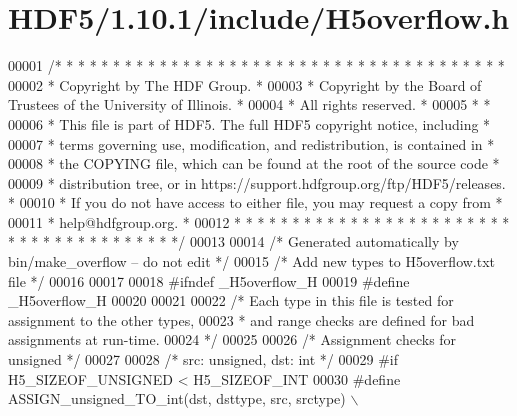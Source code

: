\hypertarget{_h_d_f5_21_810_81_2include_2_h5overflow_8h_source}{}\section{H\+D\+F5/1.10.1/include/\+H5overflow.h}
\label{_h_d_f5_21_810_81_2include_2_h5overflow_8h_source}

\begin{DoxyCode}
00001 \textcolor{comment}{/* * * * * * * * * * * * * * * * * * * * * * * * * * * * * * * * * * * * * * *}
00002 \textcolor{comment}{ * Copyright by The HDF Group.                                               *}
00003 \textcolor{comment}{ * Copyright by the Board of Trustees of the University of Illinois.         *}
00004 \textcolor{comment}{ * All rights reserved.                                                      *}
00005 \textcolor{comment}{ *                                                                           *}
00006 \textcolor{comment}{ * This file is part of HDF5.  The full HDF5 copyright notice, including     *}
00007 \textcolor{comment}{ * terms governing use, modification, and redistribution, is contained in    *}
00008 \textcolor{comment}{ * the COPYING file, which can be found at the root of the source code       *}
00009 \textcolor{comment}{ * distribution tree, or in https://support.hdfgroup.org/ftp/HDF5/releases.  *}
00010 \textcolor{comment}{ * If you do not have access to either file, you may request a copy from     *}
00011 \textcolor{comment}{ * help@hdfgroup.org.                                                        *}
00012 \textcolor{comment}{ * * * * * * * * * * * * * * * * * * * * * * * * * * * * * * * * * * * * * * */}
00013 
00014 \textcolor{comment}{/* Generated automatically by bin/make\_overflow -- do not edit */}
00015 \textcolor{comment}{/* Add new types to H5overflow.txt file */}
00016 
00017 
00018 \textcolor{preprocessor}{#ifndef \_H5overflow\_H}
00019 \textcolor{preprocessor}{#define \_H5overflow\_H}
00020 
00021 
00022 \textcolor{comment}{/* Each type in this file is tested for assignment to the other types,}
00023 \textcolor{comment}{ *      and range checks are defined for bad assignments at run-time.}
00024 \textcolor{comment}{ */}
00025 
00026 \textcolor{comment}{/* Assignment checks for unsigned */}
00027 
00028 \textcolor{comment}{/* src: unsigned, dst: int */}
00029 \textcolor{preprocessor}{#if H5\_SIZEOF\_UNSIGNED < H5\_SIZEOF\_INT}
00030 \textcolor{preprocessor}{    #define ASSIGN\_unsigned\_TO\_int(dst, dsttype, src, srctype) \(\backslash\)}

\end{DoxyCode}
